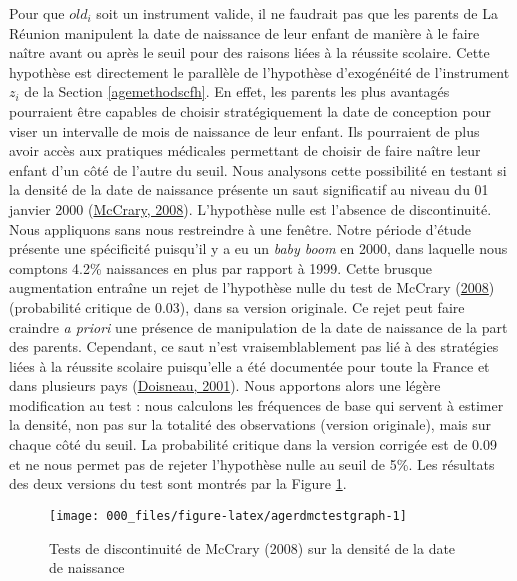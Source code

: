 \documentclass[
]{book}
\begin{document}
\quad Pour que \(old_i\) soit un instrument valide, il ne faudrait pas que les parents de La Réunion manipulent la date de naissance de leur enfant de manière à le faire naître avant ou après le seuil pour des raisons liées à la réussite scolaire. Cette hypothèse est directement le parallèle de l'hypothèse d'exogénéité de l'instrument \(z_i\) de la Section \ref{agemethodscfh}. En effet, les parents les plus avantagés pourraient être capables de choisir stratégiquement la date de conception pour viser un intervalle de mois de naissance de leur enfant. Ils pourraient de plus avoir accès aux pratiques médicales permettant de choisir de faire naître leur enfant d'un côté de l'autre du seuil. Nous analysons cette possibilité en testant si la densité de la date de naissance présente un saut significatif au niveau du 01 janvier 2000 (\protect\hyperlink{ref-MCC:08}{McCrary, 2008}). L'hypothèse nulle est l'absence de discontinuité. Nous appliquons sans nous restreindre à une fenêtre. Notre période d'étude présente une spécificité puisqu'il y a eu un \emph{baby boom} en 2000, dans laquelle nous comptons 4.2\% naissances en plus par rapport à 1999. Cette brusque augmentation entraîne un rejet de l'hypothèse nulle du test de McCrary (\protect\hyperlink{ref-MCC:08}{2008}) (probabilité critique de 0.03), dans sa version originale. Ce rejet peut faire craindre \emph{a priori} une présence de manipulation de la date de naissance de la part des parents. Cependant, ce saut n'est vraisemblablement pas lié à des stratégies liées à la réussite scolaire puisqu'elle a été documentée pour toute la France et dans plusieurs pays (\protect\hyperlink{ref-DOI:01}{Doisneau, 2001}). Nous apportons alors une légère modification au test : nous calculons les fréquences de base qui servent à estimer la densité, non pas sur la totalité des observations (version originale), mais sur chaque côté du seuil. La probabilité critique dans la version corrigée est de 0.09 et ne nous permet pas de rejeter l'hypothèse nulle au seuil de 5\%. Les résultats des deux versions du test sont montrés par la Figure \ref{fig:agerdmctestgraph}.

\begin{figure}[H]

{\centering \texttt{[image: 000\_files/figure-latex/agerdmctestgraph-1]} 

}

\caption{Tests de discontinuité de McCrary (2008) sur la densité de la date de naissance}\label{fig:agerdmctestgraph}
\end{figure}
\end{document}
